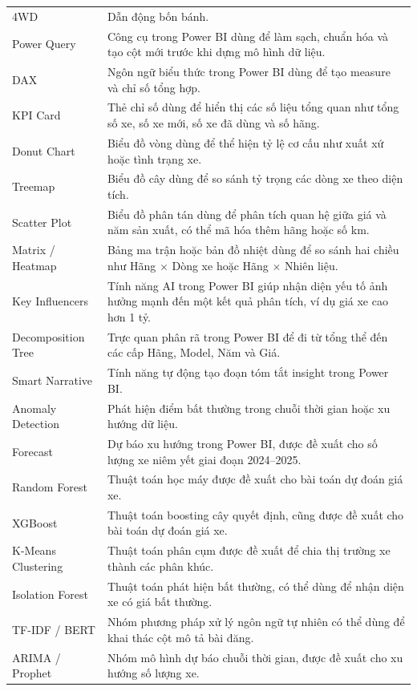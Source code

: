 \begin{longtable}{L{0.28\textwidth} L{0.62\textwidth}}
4WD & Dẫn động bốn bánh. \\
Power Query & Công cụ trong Power BI dùng để làm sạch, chuẩn hóa và tạo cột mới trước khi dựng mô hình dữ liệu. \\
DAX & Ngôn ngữ biểu thức trong Power BI dùng để tạo measure và chỉ số tổng hợp. \\
KPI Card & Thẻ chỉ số dùng để hiển thị các số liệu tổng quan như tổng số xe, số xe mới, số xe đã dùng và số hãng. \\
Donut Chart & Biểu đồ vòng dùng để thể hiện tỷ lệ cơ cấu như xuất xứ hoặc tình trạng xe. \\
Treemap & Biểu đồ cây dùng để so sánh tỷ trọng các dòng xe theo diện tích. \\
Scatter Plot & Biểu đồ phân tán dùng để phân tích quan hệ giữa giá và năm sản xuất, có thể mã hóa thêm hãng hoặc số km. \\
Matrix / Heatmap & Bảng ma trận hoặc bản đồ nhiệt dùng để so sánh hai chiều như Hãng $\times$ Dòng xe hoặc Hãng $\times$ Nhiên liệu. \\
Key Influencers & Tính năng AI trong Power BI giúp nhận diện yếu tố ảnh hưởng mạnh đến một kết quả phân tích, ví dụ giá xe cao hơn 1 tỷ. \\
Decomposition Tree & Trực quan phân rã trong Power BI để đi từ tổng thể đến các cấp Hãng, Model, Năm và Giá. \\
Smart Narrative & Tính năng tự động tạo đoạn tóm tắt insight trong Power BI. \\
Anomaly Detection & Phát hiện điểm bất thường trong chuỗi thời gian hoặc xu hướng dữ liệu. \\
Forecast & Dự báo xu hướng trong Power BI, được đề xuất cho số lượng xe niêm yết giai đoạn 2024--2025. \\
Random Forest & Thuật toán học máy được đề xuất cho bài toán dự đoán giá xe. \\
XGBoost & Thuật toán boosting cây quyết định, cũng được đề xuất cho bài toán dự đoán giá xe. \\
K-Means Clustering & Thuật toán phân cụm được đề xuất để chia thị trường xe thành các phân khúc. \\
Isolation Forest & Thuật toán phát hiện bất thường, có thể dùng để nhận diện xe có giá bất thường. \\
TF-IDF / BERT & Nhóm phương pháp xử lý ngôn ngữ tự nhiên có thể dùng để khai thác cột mô tả bài đăng. \\
ARIMA / Prophet & Nhóm mô hình dự báo chuỗi thời gian, được đề xuất cho xu hướng số lượng xe. \\
\end{longtable}
